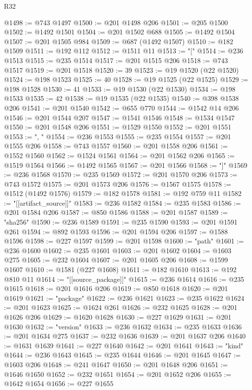 \begin{lexlean}{R32}
\begin{coremodule}
@1498 := @743 @1497
@1500 := @201 @1498 @206
@1501 := @205 @1500
@1502 := @1492 @1501
@1504 := @201 @1502 @688
@1505 := @1492 @1504
@1507 := @201 @1505 @984
@1509 := @687 (@1492 @1507)
@1510 := @182 @1509
@1511 := @192 @112
@1512 := @1511 @11
@1513 := "["
@1514 := @236 @1513
@1515 := @235 @1514
@1517 := @201 @1515 @206
@1518 := @743 @1517
@1519 := @201 @1518
@1520 := 39
@1523 := @19 @1520 (@22 @1520)
@1524 := @198 @1523
@1525 := 40
@1528 := @19 @1525 (@22 @1525)
@1529 := @198 @1528
@1530 := 41
@1533 := @19 @1530 (@22 @1530)
@1534 := @198 @1533
@1535 := 42
@1538 := @19 @1535 (@22 @1535)
@1540 := @398 @1538 @206
@1541 := @201 @1540
@1542 := @655 @770
@1544 := @1542 @14 @206
@1546 := @201 @1544 @207
@1547 := @1541 @1546
@1548 := @1534 @1547
@1550 := @201 @1548 @206
@1551 := @1529 @1550
@1552 := @201 @1551
@1553 := ", "
@1554 := @236 @1553
@1555 := @235 @1554
@1557 := @201 @1555 @206
@1558 := @743 @1557
@1560 := @201 @1558 @206
@1561 := @1552 @1560
@1562 := @1524 @1561
@1564 := @201 @1562 @206
@1565 := @1519 @1564
@1566 := @1492 @1565
@1567 := @201 @1566
@1568 := "]"
@1569 := @236 @1568
@1570 := @235 @1569
@1572 := @201 @1570 @206
@1573 := @743 @1572
@1575 := @201 @1573 @206
@1576 := @1567 @1575
@1578 := @1512 (@1492 @1576)
@1579 := @182 @1578
@1581 := @192 @759 @11
@1582 := "[[artifact_source]]"
@1583 := @236 @1582
@1584 := @235 @1583
@1586 := @201 @1584 @206
@1587 := @850 @1586
@1588 := @201 @1587
@1589 := "sha256"
@1590 := @236 @1589
@1591 := @235 @1590
@1593 := @201 @1591 @261
@1594 := @892 @1593
@1596 := @201 @1594 @206
@1597 := @1588 @1596
@1598 := @227 @1597
@1599 := @201 @1598
@1600 := "path"
@1601 := @236 @1600
@1602 := @235 @1601
@1603 := @201 @1602
@1604 := @1603 @275
@1605 := @232 @1604
@1607 := @201 @1605 @206
@1608 := @1599 @1607
@1610 := @1581 (@227 @1608)
@1611 := @182 @1610
@1613 := @192 @810 @11
@1614 := "[[source_package]]"
@1615 := @236 @1614
@1616 := @235 @1615
@1618 := @201 @1616 @206
@1619 := @850 @1618
@1620 := @201 @1619
@1621 := "package"
@1622 := @236 @1621
@1623 := @235 @1622
@1624 := @201 @1623
@1625 := @1624 @261
@1626 := @232 @1625
@1628 := @201 @1626 @206
@1629 := @1620 @1628
@1630 := @227 @1629
@1631 := @201 @1630
@1632 := "version"
@1633 := @236 @1632
@1634 := @235 @1633
@1636 := @201 @1634 @275
@1637 := @232 @1636
@1639 := @201 @1637 @206
@1640 := @1631 @1639
@1641 := @227 @1640
@1642 := @201 @1641
@1643 := "kind"
@1644 := @236 @1643
@1645 := @235 @1644
@1646 := @201 @1645
@1647 := @1603 @206
@1648 := @241 @1647
@1650 := @201 @1648 @206
@1651 := @1646 @1650
@1652 := @232 @1651
@1654 := @201 @1652 @206
@1655 := @1642 @1654
@1656 := @227 @1655

\end{coremodule}
\end{lexlean}
